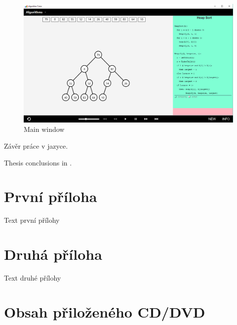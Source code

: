 \documentclass[
  field=inf,
  biblatex,
  language=english,
  glossaries,
  index
]{kidiplom}
\begin{document}
\begin{figure}[H]
\begin{center}
	
	\includegraphics[scale=0.34]{img/UI.png}
	\caption{Main window}\label{fig:ui}
\end{center}
\end{figure}

\begin{kiconclusions}
Závěr práce v  jazyce.
\end{kiconclusions}

\begin{kiconclusions}[english]
Thesis conclusions in .
\end{kiconclusions}

\appendix

\section{První příloha}
Text první přílohy

\section{Druhá příloha}
Text druhé přílohy

\section{Obsah přiloženého CD/DVD} \label{sec:ObsahCD}
\end{document}
